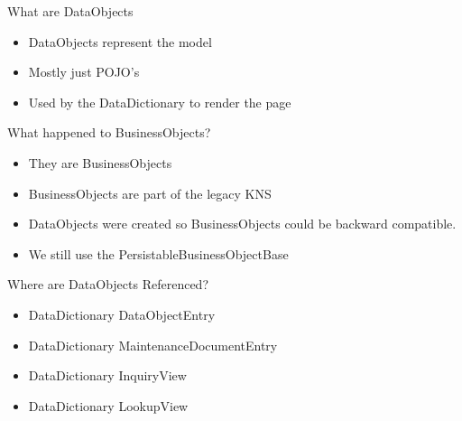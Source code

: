 \documentclass[xcolor=dvipsnames,14pt,professionalfonts]{beamer}
\begin{document}
\begin{frame}{What are DataObjects}
  \begin{itemize}
    \item DataObjects represent the model
    \item Mostly just POJO's
    \item Used by the DataDictionary to render the page
  \end{itemize}
\end{frame}

\begin{frame}{What happened to BusinessObjects?}
  \begin{itemize}
    \item They are BusinessObjects
    \item BusinessObjects are part of the legacy KNS
    \item DataObjects were created so BusinessObjects could be
      backward compatible.
    \item We still use the PersistableBusinessObjectBase
  \end{itemize}
\end{frame}

\begin{frame}{Where are DataObjects Referenced?}
  \begin{itemize}
  \item DataDictionary DataObjectEntry
  \item DataDictionary MaintenanceDocumentEntry
  \item DataDictionary InquiryView
  \item DataDictionary LookupView
  \end{itemize}
\end{frame}
\end{document}

